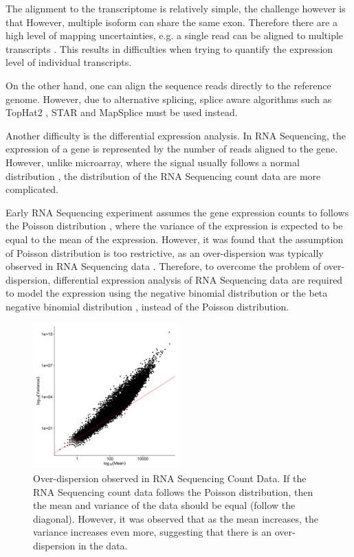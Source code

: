 \documentclass[12pt]{scrbook}
\begin{document}
The alignment to the transcriptome is relatively simple, the challenge however is that However, multiple isoform can share the same exon. 
Therefore there are a high level of mapping uncertainties, e.g. a single read can be aligned to multiple transcripts \citep{Li2011e}.
This results in difficulties when trying to quantify the expression level of individual transcripts. 

On the other hand, one can align the sequence reads directly to the reference genome. 
However, due to alternative splicing, splice aware algorithms such as  TopHat2 \citep{Kim2013}, STAR \citep{Dobin2013} and MapSplice \citep{Wang2010} must be used instead. 

Another difficulty is the differential expression analysis. 
In RNA Sequencing, the expression of a gene is represented by the number of reads aligned to the gene. 
However, unlike microarray, where the signal usually follows a normal distribution \citep{Hoyle2002,Giles2003}, the distribution of the RNA Sequencing count data are more complicated.

Early RNA Sequencing experiment assumes the gene expression counts to follows the Poisson distribution \citep{Marioni2008}, where the variance of the expression is expected to be equal to the mean of the expression.
However, it was found that the assumption of Poisson distribution is too restrictive, as an over-dispersion was typically observed in RNA Sequencing data \citep{Anders2010}.
Therefore, to overcome the problem of over-dispersion, differential expression analysis of RNA Sequencing data are required to model the expression using the negative binomial distribution \citep{Anders2010,Robinson2010} or the beta negative binomial distribution \citep{trapnell2012differential}, instead of the Poisson distribution.
	\begin{figure}
		\centering
		\includegraphics[width=0.5\textwidth]{figure/overdispersion.png}
		\caption[Over-dispersion observed in RNA Sequencing Count Data]{
			Over-dispersion observed in RNA Sequencing Count Data.
			If the RNA Sequencing count data follows the Poisson distribution, then the mean and variance of the data should be equal (follow the diagonal). 
			However, it was observed that as the mean increases, the variance increases even more, suggesting that there is an over-dispersion in the data. 
		}
	\end{figure}
	
\end{document}
